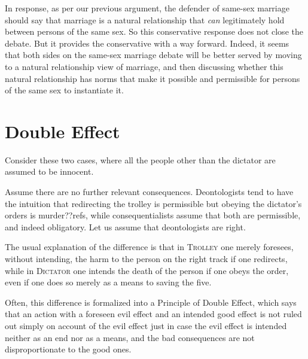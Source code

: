 In response, as per our previous argument, the defender of same-sex marriage should say that marriage is a natural relationship that \textit{can} legitimately
hold between persons of the same sex. So this conservative response does not close the debate. But it provides the conservative with a way forward. Indeed,
it seems that both sides on the same-sex marriage debate will be better served by moving to a natural relationship view of marriage, and then discussing whether
this natural relationship has norms that make it possible and permissible for persons of the same sex to instantiate it.

\section{Double Effect}
Consider these two cases, where all the people other than the dictator are assumed to be innocent.

    
    
Assume there are no further relevant consequences.  Deontologists tend to have the intuition that redirecting 
the trolley is permissible but obeying the dictator's orders is murder??refs, while consequentialists assume 
that both are permissible, and indeed obligatory. Let us assume that deontologists are right.

The usual explanation of the difference is that in \textsc{Trolley} one merely foresees, without intending, the 
harm to the person on the right track if one redirects, while in \textsc{Dictator} one intends the death of the person
if one obeys the order, even if one does so merely as a means to saving the five. 

Often, this difference is formalized into a Principle of Double Effect, which says that an action with a foreseen
evil effect and an intended good effect is not ruled out simply on account of the evil effect just in case the evil effect is 
intended neither as an end nor as a means, and the bad consequences are not disproportionate to the good ones.

